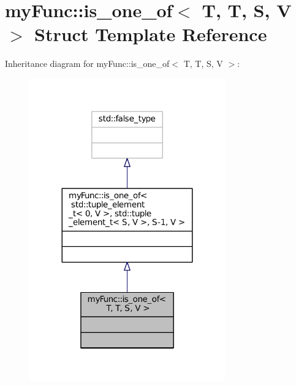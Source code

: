 \hypertarget{structmyFunc_1_1is__one__of_3_01T_00_01T_00_01S_00_01V_01_4}{}\section{my\+Func\+:\+:is\+\_\+one\+\_\+of$<$ T, T, S, V $>$ Struct Template Reference}
\label{structmyFunc_1_1is__one__of_3_01T_00_01T_00_01S_00_01V_01_4}


Inheritance diagram for my\+Func\+:\+:is\+\_\+one\+\_\+of$<$ T, T, S, V $>$\+:
\nopagebreak
\begin{figure}[H]
\begin{center}
\leavevmode
\includegraphics[width=239pt]{structmyFunc_1_1is__one__of_3_01T_00_01T_00_01S_00_01V_01_4__inherit__graph}
\end{center}
\end{figure}


